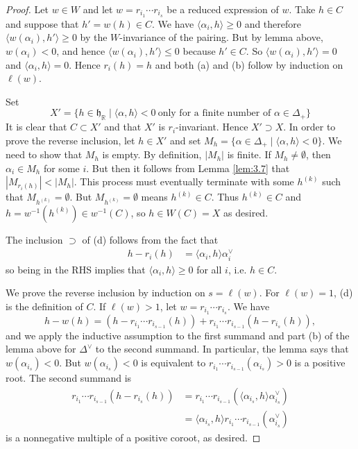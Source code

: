 \documentclass[12pt]{article}
\begin{document}
\begin{proof}
    Let $w \in W$ and let $w = r_{i_1}\cdots r_{i_s}$ be a reduced expression of $w$.
    Take $h \in C$ and suppose that $h' = w(h) \in C$.
    We have $\langle \alpha_i,h \rangle \geq 0$ and therefore
    $\langle w(\alpha_i),h' \rangle \geq 0$ by the $W$-invariance of the pairing. But by lemma above, $w(\alpha_i)<0$, and hence
    $\langle w(\alpha_i),h' \rangle \leq 0$ because $h' \in C$. So $\langle w(\alpha_i),h' \rangle = 0$ and $\langle \alpha_i,h \rangle = 0$.
    Hence $r_i(h) = h$ and both (a) and (b) follow by induction on $\ell(w)$.

    Set \[X' = \{ h \in \mathfrak{h}_{\mathbb{R}} \mid \langle \alpha,h \rangle < 0
        \ \text{only for a finite number of } \alpha \in \Delta_+ \}\]
    It is clear that $C \subset X'$ and that $X'$ is $r_i$-invariant.
    Hence $X' \supset X$. In order to prove the reverse inclusion, let $h \in X'$
    and set $M_h = \{ \alpha \in \Delta_+ \mid \langle \alpha,h \rangle < 0 \}$. We need to show that $M_h$ is empty. By definition, $|M_h|$ is finite. If $M_h \neq \emptyset$, then $\alpha_i \in M_h$
    for some $i$. But then it follows from Lemma \ref{lem:3.7} that $|M_{r_i(h)}| < |M_h|$. This process must eventually terminate with some $h^{(k)}$ such that $M_{h^{(k)}} = \emptyset$. But $M_{h^{(k)}} = \emptyset$ means $h^{(k)} \in C$. Thus $h^{(k)} \in C$ and $h = w^{-1}(h^{(k)}) \in w^{-1}(C)$, so $h \in W(C) = X$ as desired.

    The inclusion $\supset$ of (d) follows from the fact that \begin{align*}
        h - r_i(h) & = \langle \alpha_i,h \rangle \alpha_i^\vee
    \end{align*} so being in the RHS implies that $\langle \alpha_i,h \rangle \geq 0$ for all $i$, i.e. $h \in C$.


    We prove the reverse inclusion by induction on $s=\ell(w)$.
    For $\ell(w)=1$, (d) is the definition of $C$.
    If $\ell(w)>1$, let $w=r_{i_1}\cdots r_{i_s}$.
    We have
    \[
        h-w(h) = (h-r_{i_1}\cdots r_{i_{s-1}}(h)) + r_{i_1}\cdots r_{i_{s-1}}(h-r_{i_s}(h)),
    \]
    and we apply the inductive assumption to the first summand and part (b) of the lemma above for $\Delta^\vee$ to the second summand. In particular, the lemma says that $w(\alpha_{i_s})<0$.
    But $w(\alpha_{i_s})<0$ is equivalent to
    $r_{i_1}\cdots r_{i_{s-1}}(\alpha_{i_s}) > 0$ is a positive root. The second summand is \begin{align*}
        r_{i_1}\cdots r_{i_{s-1}}(h - r_{i_s}(h)) & = r_{i_1}\cdots r_{i_{s-1}}(\langle \alpha_{i_s}, h \rangle \alpha_{i_s}^\vee) \\
                                                  & = \langle \alpha_{i_s}, h \rangle r_{i_1}\cdots r_{i_{s-1}}(\alpha_{i_s}^\vee)
    \end{align*} is a nonnegative multiple of a positive coroot, as desired.


\end{proof}
\end{document}
